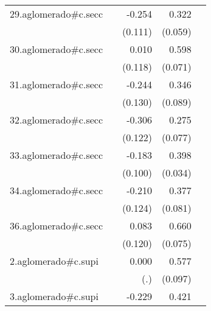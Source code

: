 {\begin{longtable}{l*{4}{D{.}{.}{-1}}}
\addlinespace
29.aglomerado#c.secc&                     &      -0.254\sym{*}  &       0.322\sym{***}&                     \\
            &                     &     (0.111)         &     (0.059)         &                     \\
\addlinespace
30.aglomerado#c.secc&                     &       0.010         &       0.598\sym{***}&                     \\
            &                     &     (0.118)         &     (0.071)         &                     \\
\addlinespace
31.aglomerado#c.secc&                     &      -0.244         &       0.346\sym{***}&                     \\
            &                     &     (0.130)         &     (0.089)         &                     \\
\addlinespace
32.aglomerado#c.secc&                     &      -0.306\sym{*}  &       0.275\sym{***}&                     \\
            &                     &     (0.122)         &     (0.077)         &                     \\
\addlinespace
33.aglomerado#c.secc&                     &      -0.183         &       0.398\sym{***}&                     \\
            &                     &     (0.100)         &     (0.034)         &                     \\
\addlinespace
34.aglomerado#c.secc&                     &      -0.210         &       0.377\sym{***}&                     \\
            &                     &     (0.124)         &     (0.081)         &                     \\
\addlinespace
36.aglomerado#c.secc&                     &       0.083         &       0.660\sym{***}&                     \\
            &                     &     (0.120)         &     (0.075)         &                     \\
\addlinespace
2.aglomerado#c.supi&                     &       0.000         &       0.577\sym{***}&                     \\
            &                     &         (.)         &     (0.097)         &                     \\
\addlinespace
3.aglomerado#c.supi&                     &      -0.229         &       0.421\sym{***}&                     \\

\end{longtable}}
